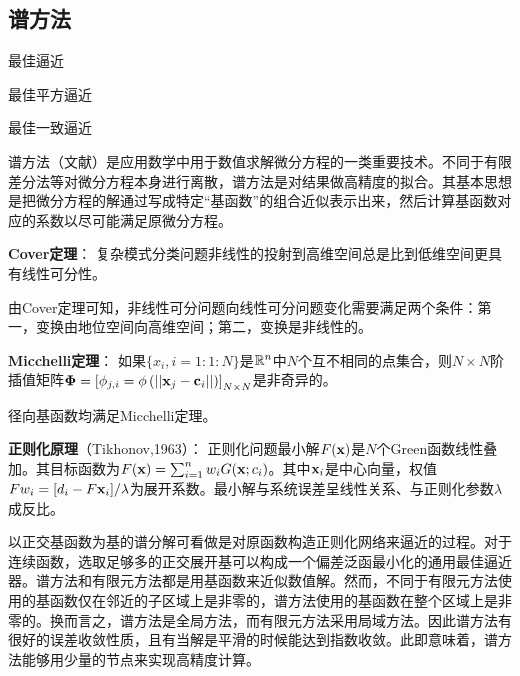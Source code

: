 \subsection{谱方法}
\label{谱方法}

最佳逼近

最佳平方逼近

最佳一致逼近

谱方法（文献）是应用数学中用于数值求解微分方程的一类重要技术。不同于有限差分法等对微分方程本身进行离散，谱方法是对结果做高精度的拟合。其基本思想是把微分方程的解通过写成特定“基函数”的组合近似表示出来，然后计算基函数对应的系数以尽可能满足原微分方程。
\begin{theorem} \label{定理-Cover}
    \textbf{Cover定理}： 复杂模式分类问题非线性的投射到高维空间总是比到低维空间更具有线性可分性。
\end{theorem}

由Cover定理可知，非线性可分问题向线性可分问题变化需要满足两个条件：第一，变换由地位空间向高维空间；第二，变换是非线性的。

\begin{theorem} \label{定理-Micchelli}
    \textbf{Micchelli定理}： 如果$\{x_i, i=1:1:N\}$是$\mathbb{R}^n$中$N$个互不相同的点集合，则$N\times N$阶插值矩阵$\boldsymbol{\Phi} = \left[\phi_{j,i}=\phi \left(||\mathbf{x}_j - \mathbf{c}_i|| \right) \right]_{N\times N}$是非奇异的。
\end{theorem}
径向基函数均满足Micchelli定理。

\begin{theorem} \label{定理-正则化原理}
    \textbf{正则化原理}（Tikhonov,1963）： 正则化问题最小解$F(\mathbf{x})$是$N$个Green函数线性叠加。其目标函数为$F(\mathbf{x})=\sum_{i=1}^n w_i G(\mathbf{x};c_i)$。其中$\mathbf{x}_i$是中心向量，权值$Fw_i=[d_i - F{\mathbf{x}_i}] / \lambda$为展开系数。最小解与系统误差呈线性关系、与正则化参数$\lambda$成反比。
\end{theorem}
以正交基函数为基的谱分解可看做是对原函数构造正则化网络来逼近的过程。对于连续函数，选取足够多的正交展开基可以构成一个偏差泛函最小化的通用最佳逼近器。谱方法和有限元方法都是用基函数来近似数值解。然而，不同于有限元方法使用的基函数仅在邻近的子区域上是非零的，谱方法使用的基函数在整个区域上是非零的。换而言之，谱方法是全局方法，而有限元方法采用局域方法。因此谱方法有很好的误差收敛性质，且有当解是平滑的时候能达到指数收敛。此即意味着，谱方法能够用少量的节点来实现高精度计算。

